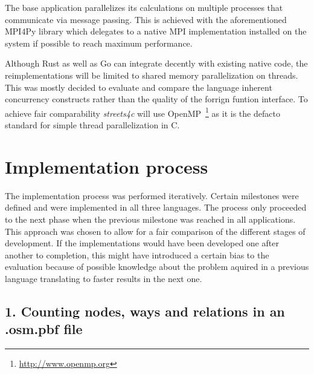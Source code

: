 The base application parallelizes its calculations on multiple processes that communicate via message passing. This is achieved with the aforementioned MPI4Py library which delegates to a native MPI implementation installed on the system if possible to reach maximum performance.

Although Rust as well as Go can integrate decently with existing native code, the reimplementations will be limited to shared memory parallelization on threads. This was mostly decided to evaluate and compare the language inherent concurrency constructs rather than the quality of the forrign funtion interface. To achieve fair comparability \textit{streets4c} will use OpenMP~\footnote{\url{http://www.openmp.org}} as it is the defacto standard for simple thread parallelization in C.

\section{Implementation process}
\label{sec:Approach::Implementation}

The implementation process was performed iteratively. Certain milestones were defined and were implemented in all three languages. The process only proceeded to the next phase when the previous milestone was reached in all applications. This approach was chosen to allow for a fair comparison of the different stages of development. If the implementations would have been developed one after another to completion, this might have introduced a certain bias to the evaluation because of possible knowledge about the problem aquired in a previous language translating to faster results in the next one.

\subsection*{1. Counting nodes, ways and relations in an .osm.pbf file}
\label{subsec:Approach::Implementation::Counting}
